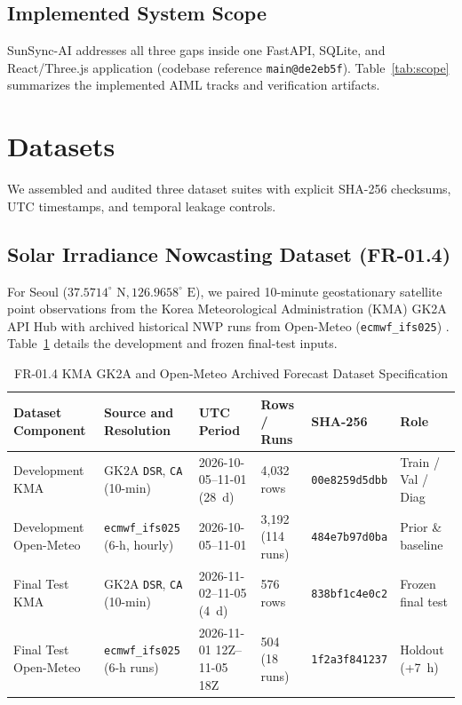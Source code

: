 \documentclass[conference]{IEEEtran}
\begin{document}
\subsection{Implemented System Scope}
SunSync-AI addresses all three gaps inside one FastAPI, SQLite, and React/Three.js application (codebase reference \texttt{main@de2eb5f}). Table~\ref{tab:scope} summarizes the implemented AIML tracks and verification artifacts.

\section{Datasets}

We assembled and audited three dataset suites with explicit SHA-256 checksums, UTC timestamps, and temporal leakage controls.

\subsection{Solar Irradiance Nowcasting Dataset (FR-01.4)}
For Seoul ($37.5714^\circ\text{ N}, 126.9658^\circ\text{ E}$), we paired 10-minute geostationary satellite point observations from the Korea Meteorological Administration (KMA) GK2A API Hub \cite{b8} with archived historical NWP runs from Open-Meteo (\texttt{ecmwf\_ifs025}) \cite{b9}. Table~\ref{tab:fr01_data} details the development and frozen final-test inputs.

\begin{table}[t]
\caption{FR-01.4 KMA GK2A and Open-Meteo Archived Forecast Dataset Specification}
\label{tab:fr01_data}
\centering
\footnotesize
\setlength{\tabcolsep}{4.5pt}
\renewcommand{\arraystretch}{1.12}
\begin{tabular}{@{}llllll@{}}
\toprule
\textbf{Dataset Component} & \textbf{Source and Resolution} & \textbf{UTC Period} & \textbf{Rows / Runs} & \textbf{SHA-256} & \textbf{Role} \\
\midrule
Development KMA & GK2A \texttt{DSR}, \texttt{CA} (10-min) & 2026-10-05--11-01 (28~d) & 4,032 rows & \texttt{00e8259d5dbb} & Train / Val / Diag \\
Development Open-Meteo & \texttt{ecmwf\_ifs025} (6-h, hourly) & 2026-10-05--11-01 & 3,192 (114 runs) & \texttt{484e7b97d0ba} & Prior \& baseline \\
Final Test KMA & GK2A \texttt{DSR}, \texttt{CA} (10-min) & 2026-11-02--11-05 (4~d) & 576 rows & \texttt{838bf1c4e0c2} & Frozen final test \\
Final Test Open-Meteo & \texttt{ecmwf\_ifs025} (6-h runs) & 2026-11-01 12Z--11-05 18Z & 504 (18 runs) & \texttt{1f2a3f841237} & Holdout (+7~h) \\
\bottomrule
\end{tabular}
\end{table}
\end{document}
